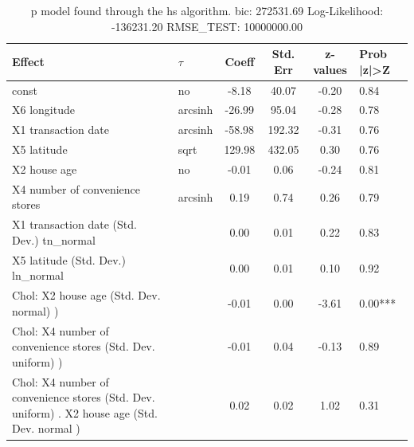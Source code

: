 \begin{table}
	\caption{p model found through the hs algorithm. bic: 272531.69 Log-Likelihood: -136231.20 RMSE_TEST: 10000000.00}
	\begin{center}
		\begin{tabular}{|l|l|c|c|c|l|}
			\hline
			Effect & $\tau$ & Coeff & Std. Err & z-values & Prob |z|>Z \\
			\hline
			const & no & -8.18 & 40.07 & -0.20 & 0.84 \\
			\hline
			X6 longitude & arcsinh & -26.99 & 95.04 & -0.28 & 0.78 \\
			\hline
			X1 transaction date & arcsinh & -58.98 & 192.32 & -0.31 & 0.76 \\
			\hline
			X5 latitude & sqrt & 129.98 & 432.05 & 0.30 & 0.76 \\
			\hline
			X2 house age & no & -0.01 & 0.06 & -0.24 & 0.81 \\
			\hline
			X4 number of convenience stores & arcsinh & 0.19 & 0.74 & 0.26 & 0.79 \\
			\hline
			X1 transaction date (Std. Dev.) tn_normal &  & 0.00 & 0.01 & 0.22 & 0.83 \\
			\hline
			X5 latitude (Std. Dev.) ln_normal &  & 0.00 & 0.01 & 0.10 & 0.92 \\
			\hline
			 Chol: X2 house age (Std. Dev. normal) ) &  & -0.01 & 0.00 & -3.61 & 0.00*** \\
			\hline
			 Chol: X4 number of convenience stores (Std. Dev. uniform) ) &  & -0.01 & 0.04 & -0.13 & 0.89 \\
			\hline
			 Chol: X4 number of convenience stores (Std. Dev. uniform) . X2 house age (Std. Dev.   normal ) &  & 0.02 & 0.02 & 1.02 & 0.31 \\
			\hline
		\end{tabular}
	\end{center}
\end{table}